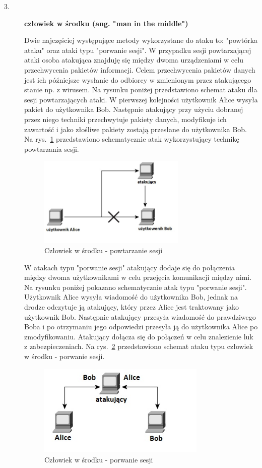 \documentclass[12p]{article}
\begin{document}
\begin{description}
\item [3. ]  \textbf{człowiek w środku (ang. "man in the middle")}

\quad Dwie najczęściej występujące metody wykorzystane do ataku to: "powtórka ataku" oraz ataki typu "porwanie sesji". W przypadku sesji powtarzającej ataki osoba atakująca znajduję się między dwoma urządzeniami w celu przechwycenia pakietów informacji. Celem przechwycenia pakietów danych jest ich późniejsze wysłanie do odbiorcy w zmienionym przez atakującego stanie np. z wirusem. Na rysunku poniżej przedstawiono schemat ataku dla sesji powtarzających ataki. W pierwszej kolejności użytkownik Alice wysyła pakiet do użytkownika Bob. Następnie atakujący przy użyciu dobranej przez niego techniki przechwytuje pakiety danych, modyfikuje ich zawartość i jako złośliwe pakiety zostają przesłane do użytkownika Bob. Na rys.~\ref{Powtarzajace_ataki} przedstawiono schematycznie atak wykorzystujący technikę powtarzania sesji.
\begin{figure}[H]
\centering
\includegraphics[width=7cm]{Powtarzajace_ataki.jpg}
\caption{Człowiek w środku - powtarzanie sesji}\label{Powtarzajace_ataki}
\end{figure}

\quad W atakach typu "porwanie sesji" atakujący dodaje się do połączenia między dwoma użytkownikami w celu przejęcia komunikacji między nimi. Na rysunku poniżej pokazano schematycznie atak typu "porwanie sesji". Użytkownik Alice wysyła wiadomość do użytkownika Bob, jednak na drodze odczytuje ją atakujący, który przez Alice jest traktowany jako użytkownik Bob. Następnie atakujący przesyła wiadomość do prawdziwego Boba i po otrzymaniu jego odpowiedzi przesyła ją do użytkownika Alice po zmodyfikowaniu. Atakujący dołącza się do połączeń w celu znalezienie luk z zabezpieczeniach. Na rys.~\ref{Porwanie_sesji} przedstawiono schemat ataku typu człowiek w środku - porwanie sesji.
\begin{figure}[H]
\centering
\includegraphics[width=8cm]{Porwanie_sesji.jpg}
\caption{Człowiek w środku - porwanie sesji}\label{Porwanie_sesji}
\end{figure}


\end{description}
\end{document}
